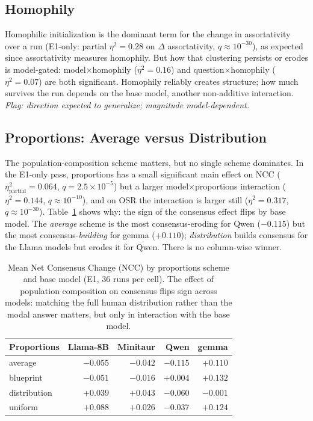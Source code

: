 \documentclass[letterpaper]{article} %
\begin{document}
\subsection{Homophily}
\label{sec:homophily}

Homophilic initialization is the dominant term for the change in assortativity over a run (E1-only: partial $\eta^2 = 0.28$ on $\Delta$ assortativity, $q \approx 10^{-30}$), as expected since assortativity measures homophily. But how that clustering persists or erodes is model-gated: model$\times$homophily ($\eta^2 = 0.16$) and question$\times$homophily ($\eta^2 = 0.07$) are both significant. Homophily reliably creates structure; how much survives the run depends on the base model, another non-additive interaction. \emph{Flag: direction expected to generalize; magnitude model-dependent.}

\subsection{Proportions: Average versus Distribution}
\label{sec:proportions}

The population-composition scheme matters, but no single scheme dominates. In the E1-only pass, proportions has a small significant main effect on NCC ($\eta^2_{\text{partial}} = 0.064$, $q = 2.5\times10^{-5}$) but a larger model$\times$proportions interaction ($\eta^2 = 0.144$, $q \approx 10^{-10}$), and on OSR the interaction is larger still ($\eta^2 = 0.317$, $q \approx 10^{-30}$). Table~\ref{tab:proportions} shows why: the sign of the consensus effect flips by base model. The \emph{average} scheme is the most consensus-eroding for Qwen ($-0.115$) but the most consensus-\emph{building} for gemma ($+0.110$); \emph{distribution} builds consensus for the Llama models but erodes it for Qwen. There is no column-wise winner.

\begin{table}[t]
\centering
\small
\setlength{\tabcolsep}{3.5pt}
\begin{tabular}{lrrrr}
\toprule
Proportions & Llama-8B & Minitaur & Qwen & gemma \\
\midrule
average & $-0.055$ & $-0.042$ & $-0.115$ & $+0.110$ \\
blueprint & $-0.051$ & $-0.016$ & $+0.004$ & $+0.132$ \\
distribution & $+0.039$ & $+0.043$ & $-0.060$ & $-0.001$ \\
uniform & $+0.088$ & $+0.026$ & $-0.037$ & $+0.124$ \\
\bottomrule
\end{tabular}
\caption{Mean Net Consensus Change (NCC) by proportions scheme and base model (E1, 36 runs per cell). The effect of population composition on consensus flips sign across models: matching the full human distribution rather than the modal answer matters, but only in interaction with the base model.}
\label{tab:proportions}
\end{table}
\end{document}
